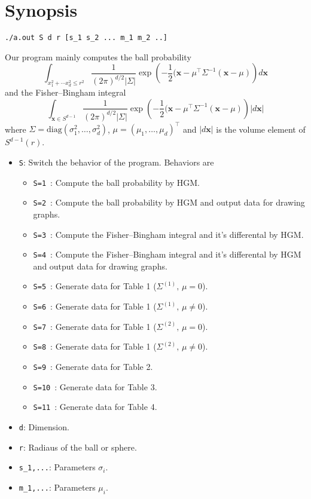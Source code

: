 \documentclass{article}
\begin{document}
\section{Synopsis}
\begin{verbatim}
./a.out S d r [s_1 s_2 ... m_1 m_2 ..]
\end{verbatim}
Our program mainly computes 
the ball probability
$$
\int_{x_1^2+\cdots x_d^2\leq r^2} \frac{1}{(2\pi)^{d/2}|\Sigma|}
\exp\left(-\frac{1}{2}(\mathbf x-\mu^\top\Sigma^{-1}(\mathbf x-\mu)\right)
d\mathbf x
$$
and the Fisher--Bingham integral
$$
\int_{\mathbf x\in S^{d-1}} \frac{1}{(2\pi)^{d/2}|\Sigma|}
\exp\left(-\frac{1}{2}(\mathbf x-\mu^\top\Sigma^{-1}(\mathbf x-\mu)\right)
|d\mathbf x|
$$
where $\Sigma=\mathrm{diag}(\sigma_1^2,\dots,\sigma_d^2)$,
$\mu=(\mu_1,\dots,\mu_d)^\top$ and 
$|d\mathbf x|$ is the volume element of $S^{d-1}(r)$.
\begin{itemize}
\item \verb+S+\/: Switch the behavior of the program. Behaviors are
  \begin{itemize}
    \item \verb+S=1+\ : %
    Compute the ball probability by HGM.
    \item \verb+S=2+\ : %
    Compute the ball probability by HGM and output data for drawing graphs.
    \item \verb+S=3+\ : %
    Compute the Fisher--Bingham integral and it's differental by HGM.
    \item \verb+S=4+\ : %
    Compute the Fisher--Bingham integral and it's differental by HGM
    and output data for drawing graphs.
    \item \verb+S=5+\ : %
    Generate data for Table 1 ($\Sigma^{(1)},\,\mu=0$).
    \item \verb+S=6+\ : %
    Generate data for Table 1 ($\Sigma^{(1)},\,\mu\neq 0$).
    \item \verb+S=7+\ : %
    Generate data for Table 1 ($\Sigma^{(2)},\,\mu=0$).
    \item \verb+S=8+\ : %
    Generate data for Table 1 ($\Sigma^{(2)},\,\mu\neq 0$).
    \item \verb+S=9+\ : %
    Generate data for Table 2.
    \item \verb+S=10+\ : %
    Generate data for Table 3.
    \item \verb+S=11+\ : %
    Generate data for Table 4.
  \end{itemize}
\item \verb+d+\/: Dimension.
\item \verb+r+\/: Radiaus of the ball or sphere.
\item \verb+s_1,...+\/: Parameters $\sigma_i$.
\item \verb+m_1,...+\/: Parameters $\mu_i$.
\end{itemize}
\end{document}
